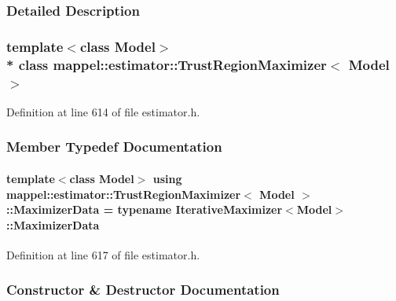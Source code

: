 \subsubsection{Detailed Description}
\subsubsection*{template$<$class Model$>$\\*
class mappel\+::estimator\+::\+Trust\+Region\+Maximizer$<$ Model $>$}



Definition at line 614 of file estimator.\+h.



\subsubsection{Member Typedef Documentation}
\paragraph[{\texorpdfstring{Maximizer\+Data}{MaximizerData}}]{\setlength{\rightskip}{0pt plus 5cm}template$<$class Model$>$ using {\bf mappel\+::estimator\+::\+Trust\+Region\+Maximizer}$<$ Model $>$\+::{\bf Maximizer\+Data} =  typename {\bf Iterative\+Maximizer}$<$Model$>$\+::{\bf Maximizer\+Data}}\hypertarget{classmappel_1_1estimator_1_1TrustRegionMaximizer_a7993af21f384fe7506a043dc0548d1b4}{}\label{classmappel_1_1estimator_1_1TrustRegionMaximizer_a7993af21f384fe7506a043dc0548d1b4}


Definition at line 617 of file estimator.\+h.



\subsubsection{Constructor \& Destructor Documentation}
